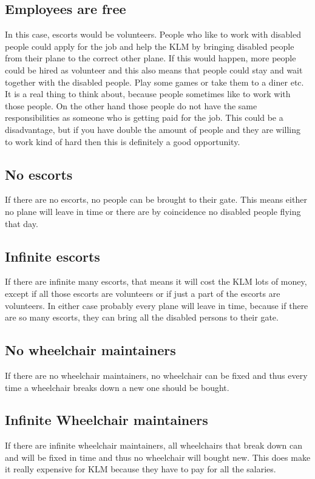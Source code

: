 \documentclass[a4paper, 11pt, notitlepage]{report}
\begin{document}
\subsection{Employees are free}
In this case, escorts would be volunteers. People who like to work with disabled people could apply for the job and help the KLM by bringing disabled people from their plane to the correct other plane. If this would happen, more people could be hired as volunteer and this also means that people could stay and wait together with the disabled people. Play some games or take them to a diner etc. It is a real thing to think about, because people sometimes like to work with those people. On the other hand those people do not have the same responsibilities as someone who is getting paid for the job. This could be a disadvantage, but if you have double the amount of people and they are willing to work kind of hard then this is definitely a good opportunity.
\subsection{No escorts}
If there are no escorts, no people can be brought to their gate. This means either no plane will leave in time or there are by coincidence no disabled people flying that day.
\subsection{Infinite escorts}
If there are infinite many escorts, that means it will cost the KLM lots of money, except if all those escorts are volunteers or if just a part of the escorts are volunteers. In either case probably every plane will leave in time, because if there are so many escorts, they can bring all the disabled persons to their gate.
\subsection{No wheelchair maintainers}
If there are no wheelchair maintainers, no wheelchair can be fixed and thus every time a wheelchair breaks down a new one should be bought.
\subsection{Infinite Wheelchair maintainers}
If there are infinite wheelchair maintainers, all wheelchairs that break down can and will be fixed in time and thus no wheelchair will bought new. This does make it really expensive for KLM because they have to pay for all the salaries.
\end{document}

